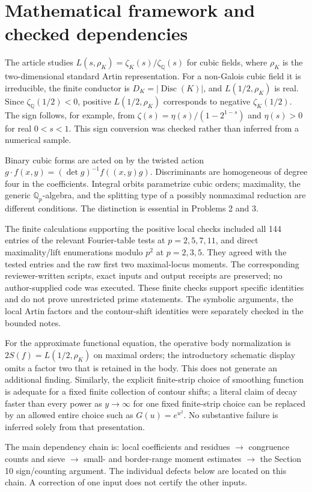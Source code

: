 \documentclass[10pt]{article}
\begin{document}
\section*{Mathematical framework and checked dependencies}
The article studies \(L(s,\rho_K)=\zeta_K(s)/\zeta_{\mathbb Q}(s)\) for cubic fields, where \(\rho_K\) is the two-dimensional standard Artin representation. For a non-Galois cubic field it is irreducible, the finite conductor is \(D_K=|\operatorname{Disc}(K)|\), and \(L(1/2,\rho_K)\) is real. Since \(\zeta_{\mathbb Q}(1/2)<0\), positive \(L(1/2,\rho_K)\) corresponds to negative \(\zeta_K(1/2)\). The sign follows, for example, from \(\zeta(s)=\eta(s)/(1-2^{1-s})\) and \(\eta(s)>0\) for real \(0<s<1\). This sign conversion was checked rather than inferred from a numerical sample.\par
Binary cubic forms are acted on by the twisted action \(g\cdot f(x,y)=(\det g)^{-1}f((x,y)g)\). Discriminants are homogeneous of degree four in the coefficients. Integral orbits parametrize cubic orders; maximality, the generic \(\mathbb Q_p\)-algebra, and the splitting type of a possibly nonmaximal reduction are different conditions. The distinction is essential in Problems 2 and 3.\par
The finite calculations supporting the positive local checks included all 144 entries of the relevant Fourier-table tests at \(p=2,5,7,11\), and direct maximality/lift enumerations modulo \(p^2\) at \(p=2,3,5\). They agreed with the tested entries and the raw first two maximal-locus moments. The corresponding reviewer-written scripts, exact inputs and output receipts are preserved; no author-supplied code was executed. These finite checks support specific identities and do not prove unrestricted prime statements. The symbolic arguments, the local Artin factors and the contour-shift identities were separately checked in the bounded notes.\par
For the approximate functional equation, the operative body normalization is \(2S(f)=L(1/2,\rho_K)\) on maximal orders; the introductory schematic display omits a factor two that is retained in the body. This does not generate an additional finding. Similarly, the explicit finite-strip choice of smoothing function is adequate for a fixed finite collection of contour shifts; a literal claim of decay faster than every power as \(y\to\infty\) for one fixed finite-strip choice can be replaced by an allowed entire choice such as \(G(u)=e^{u^2}\). No substantive failure is inferred solely from that presentation.\par
The main dependency chain is: local coefficients and residues \(\longrightarrow\) congruence counts and sieve \(\longrightarrow\) small- and border-range moment estimates \(\longrightarrow\) the Section 10 sign/counting argument. The individual defects below are located on this chain. A correction of one input does not certify the other inputs.\par
\end{document}
